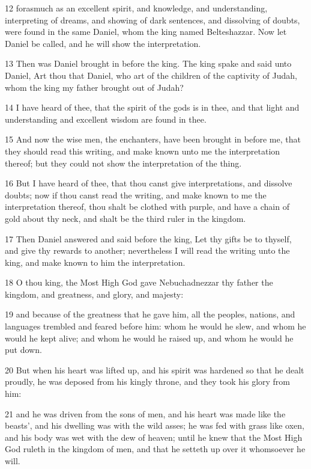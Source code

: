 \par 12 forasmuch as an excellent spirit, and knowledge, and understanding, interpreting of dreams, and showing of dark sentences, and dissolving of doubts, were found in the same Daniel, whom the king named Belteshazzar. Now let Daniel be called, and he will show the interpretation.
\par 13 Then was Daniel brought in before the king. The king spake and said unto Daniel, Art thou that Daniel, who art of the children of the captivity of Judah, whom the king my father brought out of Judah?
\par 14 I have heard of thee, that the spirit of the gods is in thee, and that light and understanding and excellent wisdom are found in thee.
\par 15 And now the wise men, the enchanters, have been brought in before me, that they should read this writing, and make known unto me the interpretation thereof; but they could not show the interpretation of the thing.
\par 16 But I have heard of thee, that thou canst give interpretations, and dissolve doubts; now if thou canst read the writing, and make known to me the interpretation thereof, thou shalt be clothed with purple, and have a chain of gold about thy neck, and shalt be the third ruler in the kingdom.
\par 17 Then Daniel answered and said before the king, Let thy gifts be to thyself, and give thy rewards to another; nevertheless I will read the writing unto the king, and make known to him the interpretation.
\par 18 O thou king, the Most High God gave Nebuchadnezzar thy father the kingdom, and greatness, and glory, and majesty:
\par 19 and because of the greatness that he gave him, all the peoples, nations, and languages trembled and feared before him: whom he would he slew, and whom he would he kept alive; and whom he would he raised up, and whom he would he put down.
\par 20 But when his heart was lifted up, and his spirit was hardened so that he dealt proudly, he was deposed from his kingly throne, and they took his glory from him:
\par 21 and he was driven from the sons of men, and his heart was made like the beasts', and his dwelling was with the wild asses; he was fed with grass like oxen, and his body was wet with the dew of heaven; until he knew that the Most High God ruleth in the kingdom of men, and that he setteth up over it whomsoever he will.
